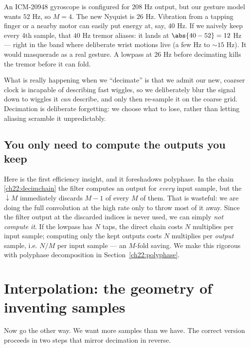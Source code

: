\begin{example}
\label{ch22:ex-imu}
An ICM-20948 gyroscope is configured for $208$ Hz output, but our gesture model
wants $52$ Hz, so $M = 4$. The new Nyquist is $26$ Hz. Vibration from a tapping
finger or a nearby motor can easily put energy at, say, $40$ Hz. If we naively
keep every 4th sample, that $40$ Hz tremor aliases: it lands at
$\abs{40 - 52} = 12$ Hz --- right in the band where deliberate wrist motions
live (a few Hz to $\sim 15$ Hz). It would masquerade as a real gesture. A
lowpass at $26$ Hz before decimating kills the tremor before it can fold.
\end{example}

\begin{happeningbox}
What is really happening when we ``decimate'' is that we admit our new, coarser
clock is incapable of describing fast wiggles, so we deliberately blur the
signal down to wiggles it \emph{can} describe, and only then re-sample it on the
coarse grid. Decimation is deliberate forgetting: we choose what to lose, rather
than letting aliasing scramble it unpredictably.
\end{happeningbox}

\subsection{You only need to compute the outputs you keep}

Here is the first efficiency insight, and it foreshadows polyphase. In the chain
\eqref{ch22:decimchain} the filter computes an output for \emph{every} input
sample, but the $\downarrow M$ immediately discards $M-1$ of every $M$ of them.
That is wasteful: we are doing the full convolution at the high rate only to
throw most of it away. Since the filter output at the discarded indices is never
used, we can simply \emph{not compute it}. If the lowpass has $N$ taps, the
direct chain costs $N$ multiplies per input sample; computing only the kept
outputs costs $N$ multiplies per \emph{output} sample, i.e. $N/M$ per input
sample --- an $M$-fold saving. We make this rigorous with polyphase
decomposition in Section~\ref{ch22:polyphase}.

\section{Interpolation: the geometry of inventing samples}
\label{ch22:interp}

Now go the other way. We want more samples than we have. The correct version
proceeds in two steps that mirror decimation in reverse.

